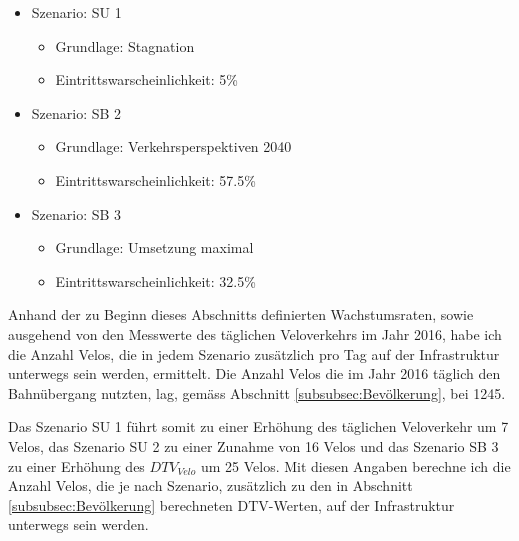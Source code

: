 \begin{itemize}
\item Szenario: SU 1
	\begin{itemize}
	\item Grundlage: Stagnation 
	\item Eintrittswarscheinlichkeit: 5\%
	\end{itemize}
\item Szenario: SB 2
	\begin{itemize}
	\item Grundlage: Verkehrsperspektiven 2040
	\item Eintrittswarscheinlichkeit: 57.5\%
	\end{itemize}
\item Szenario: SB 3
	\begin{itemize}
	\item Grundlage: Umsetzung maximal
	\item Eintrittswarscheinlichkeit: 32.5\%
	\end{itemize}
\end{itemize}

Anhand der zu Beginn dieses Abschnitts definierten Wachstumsraten, sowie ausgehend von den Messwerte des täglichen Veloverkehrs im Jahr 2016, habe ich die Anzahl Velos, die in jedem Szenario zusätzlich pro Tag auf der Infrastruktur unterwegs sein werden, ermittelt. 
Die Anzahl Velos die im Jahr 2016 täglich den Bahnübergang nutzten, lag, gemäss Abschnitt \ref{subsubsec:Bevölkerung}, bei 1245.

Das Szenario SU 1 führt somit zu einer Erhöhung des täglichen Veloverkehr um 7 Velos, das Szenario SU 2 zu einer Zunahme von 16 Velos und das Szenario SB 3 zu einer Erhöhung des $DTV_{Velo}$ um 25 Velos. 
Mit diesen Angaben berechne ich die Anzahl Velos, die je nach Szenario, zusätzlich zu den in Abschnitt \ref{subsubsec:Bevölkerung} berechneten DTV-Werten, auf der Infrastruktur unterwegs sein werden.

\pagebreak

%

